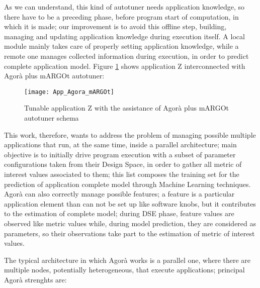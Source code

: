 As we can understand, this kind of autotuner needs application knowledge, so there have to be a preceding phase, before program start of computation, in which it is made; our improvement is to avoid this offline step, building, managing and updating application knowledge during execution itself. A local module mainly takes care of properly setting application knowledge, while a remote one manages collected information during execution, in order to predict complete application model. Figure \ref{fig::appAGORA} shows application Z interconnected with Agorà plus mARGOt autotuner:

\begin{figure}[H]

    \centering
    \texttt{[image: App\_Agora\_mARGOt]}
    \caption{Tunable application Z with the assistance of Agorà plus mARGOt autotuner schema}
    \label{fig::appAGORA}
    
\end{figure}

This work, therefore, wants to address the problem of managing possible multiple applications that run, at the same time, inside a parallel architecture; main objective is to initially drive program execution with a subset of parameter configurations taken from their Design Space, in order to gather all metric of interest values associated to them; this list composes the training set for the prediction of application complete model through Machine Learning techniques. Agorà can also correctly manage possible features; a feature is a particular application element than can not be set up like software knobs, but it contributes to the estimation of complete model; during DSE phase, feature values are observed like metric values while, during model prediction, they are considered as parameters, so their observations take part to the estimation of metric of interest values.

The typical architecture in which Agorà works is a parallel one, where there are multiple nodes, potentially heterogeneous, that execute applications; principal Agorà strenghts are:

